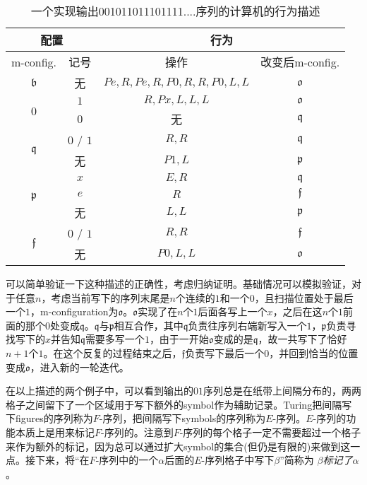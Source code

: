 \documentclass[8pt]{article}
\begin{document}
\begin{table}
	\centering
	\begin{tabular}{cc|cc}
		\multicolumn{2}{c|}{配置} &  \multicolumn{2}{c}{行为}\\
		\hline
		m-config. & 记号 & 操作 & 改变后m-config.\\
		\hline
		$\mathfrak b$ & 无 & $Pe, R, Pe, R, P0, R, R, P0, L, L$ & $\mathfrak o$\\
		\hline
		\multirow{2}{*}{$\mathfrak 0$} & $1$ & $R, Px, L, L, L$ & $\mathfrak o$\\
		& $0$ & 无 & $\mathfrak q$\\
		\hline
		\multirow{2}{*}{$\mathfrak q$} & $0$ / $1$ & $R, R$ & $\mathfrak q$\\
		& 无 & $P1, L$ & $\mathfrak p$\\
		\hline
		\multirow{3}{*}{$\mathfrak p$} & $x$ & $E, R$ & $\mathfrak q$\\
		& $e$ & $R$ & $\mathfrak f$\\
		& 无 & $L, L$ & $\mathfrak p$\\
		\hline
		\multirow{2}{*}{$\mathfrak f$} & $0$ / $1$ & $R, R$ & $\mathfrak f$\\
		& 无 & $P0, L, L$ & $\mathfrak o$\\
	\end{tabular}
	\caption{一个实现输出001011011101111....序列的计算机的行为描述}
	\label{table3}
\end{table}

可以简单验证一下这种描述的正确性，考虑归纳证明。基础情况可以模拟验证，对于任意$n$，考虑当前写下的序列末尾是$n$个连续的$1$和一个$0$，且扫描位置处于最后一个$1$，m-configuration为$\mathfrak o$。$\mathfrak o$实现了在$n$个$1$后面各写上一个$x$，之后在这$n$个$1$前面的那个$0$处变成$\mathfrak q$。$\mathfrak{q}$与$\mathfrak{p}$相互合作，其中$\mathfrak{q}$负责往序列右端新写入一个$1$，$\mathfrak{p}$负责寻找写下的$x$并告知$\mathfrak{q}$需要多写一个$1$，由于一开始$\mathfrak o$变成的是$\mathfrak q$，故一共写下了恰好$n+1$个$1$。在这个反复的过程结束之后，$\mathfrak f$负责写下最后一个$0$，并回到恰当的位置变成$\mathfrak o$，进入新的一轮迭代。

在以上描述的两个例子中，可以看到输出的$01$序列总是在纸带上间隔分布的，两两格子之间留下了一个区域用于写下额外的symbol作为辅助记录。Turing把间隔写下figures的序列称为$F$-序列，把间隔写下symbols的序列称为$E$-序列。$E$-序列的功能本质上是用来标记$F$-序列的。注意到$F$-序列的每个格子一定不需要超过一个格子来作为额外的标记，因为总可以通过扩大symbol的集合(但仍是有限的)来做到这一点。接下来，将“在$F$-序列中的一个$\alpha$后面的$E$-序列格子中写下$\beta$”简称为 \textit{$\beta$标记了$\alpha$}。
\end{document}
